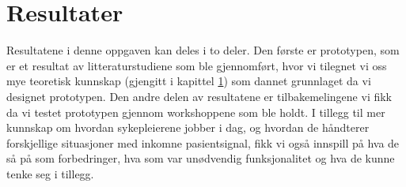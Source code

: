 \chapter{Resultater}
\label{chp:resultater}

Resultatene i denne oppgaven kan deles i to deler. Den første er prototypen, som er et resultat av litteraturstudiene som ble gjennomført, hvor vi tilegnet vi oss mye teoretisk kunnskap (gjengitt i kapittel \ref{chp:resultater}) som dannet grunnlaget da vi designet prototypen. Den andre delen av resultatene er tilbakemelingene vi fikk da vi testet prototypen gjennom workshoppene som ble holdt. I tillegg til mer kunnskap om hvordan sykepleierene jobber i dag, og hvordan de håndterer forskjellige situasjoner med inkomne pasientsignal, fikk vi også innspill på hva de så på som forbedringer, hva som var unødvendig funksjonalitet og hva de kunne tenke seg i tillegg.  